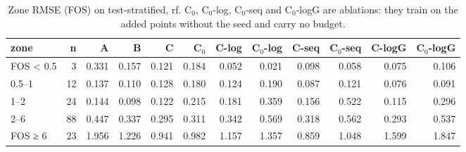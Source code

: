 \begin{table}[htbp]
\centering
\small
\setlength{\tabcolsep}{4pt}
\caption{Zone RMSE (FOS) on test-stratified, rf. C$_0$, C$_0$-log, C$_0$-seq and C$_0$-logG are ablations: they train on the added points without the seed and carry no budget.}
\label{tab:test-stratified__fos-rmse:zones:rf}
\begin{tabular}{lrrrrrrrrrrr}
\toprule
zone & n & A & B & C & C$_0$ & C-log & C$_0$-log & C-seq & C$_0$-seq & C-logG & C$_0$-logG \\
\midrule
FOS < 0.5 & 3 & 0.331 & 0.157 & 0.121 & 0.184 & 0.052 & 0.021 & 0.098 & 0.058 & 0.075 & 0.106 \\
0.5–1 & 12 & 0.137 & 0.110 & 0.128 & 0.180 & 0.124 & 0.190 & 0.087 & 0.121 & 0.076 & 0.091 \\
1–2 & 24 & 0.144 & 0.098 & 0.122 & 0.215 & 0.181 & 0.359 & 0.156 & 0.522 & 0.115 & 0.296 \\
2–6 & 88 & 0.447 & 0.337 & 0.295 & 0.311 & 0.342 & 0.569 & 0.318 & 0.562 & 0.293 & 0.537 \\
FOS ≥ 6 & 23 & 1.956 & 1.226 & 0.941 & 0.982 & 1.157 & 1.357 & 0.859 & 1.048 & 1.599 & 1.847 \\
\bottomrule
\end{tabular}
\end{table}

